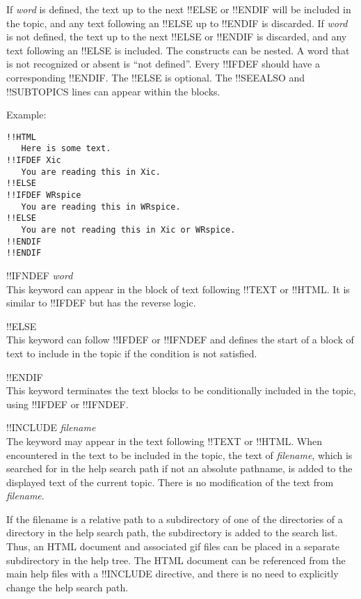 \begin{description}
If {\it word} is defined, the text up to the next {\vt !!ELSE} or {\vt
!!ENDIF} will be included in the topic, and any text following an {\vt
!!ELSE} up to {\vt !!ENDIF} is discarded.  If {\it word} is not
defined, the text up to the next {\vt !!ELSE} or {\vt !!ENDIF} is
discarded, and any text following an {\vt !!ELSE} is included.  The
constructs can be nested.  A word that is not recognized or absent is
``not defined''.  Every {\vt !!IFDEF} should have a corresponding {\vt
!!ENDIF}.  The {\vt !!ELSE} is optional.  The {\vt !!SEEALSO} and {\vt
!!SUBTOPICS} lines can appear within the blocks.

Example:
\begin{verbatim}
!!HTML
   Here is some text.
!!IFDEF Xic
   You are reading this in Xic.
!!ELSE
!!IFDEF WRspice
   You are reading this in WRspice.
!!ELSE
   You are not reading this in Xic or WRspice.
!!ENDIF
!!ENDIF
\end{verbatim}

\item{\vt !!IFNDEF {\it word}}\\
This keyword can appear in the block of text following {\vt !!TEXT} or
{\vt !!HTML}.  It is similar to {\vt !!IFDEF} but has the reverse
logic.

\item{\vt !!ELSE}\\
This keyword can follow {\vt !!IFDEF} or {\vt !!IFNDEF} and defines
the start of a block of text to include in the topic if the condition
is not satisfied.

\item{\vt !!ENDIF}\\
This keyword terminates the text blocks to be conditionally included
in the topic, using {\vt !!IFDEF} or {\vt !!IFNDEF}.

\item{\vt !!INCLUDE {\it filename}}\\
The keyword may appear in the text following {\vt !!TEXT} or {\vt
!!HTML}.  When encountered in the text to be included in the topic,
the text of {\it filename}, which is searched for in the help search
path if not an absolute pathname, is added to the displayed text of
the current topic.  There is no modification of the text from {\it
filename}.

If the filename is a relative path to a subdirectory of one of the
directories of a directory in the help search path, the subdirectory
is added to the search list.  Thus, an HTML document and associated
gif files can be placed in a separate subdirectory in the help tree. 
The HTML document can be referenced from the main help files with a
{\vt !!INCLUDE} directive, and there is no need to explicitly change
the help search path.


\end{description}
